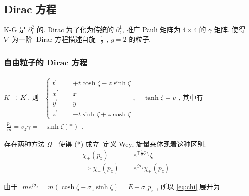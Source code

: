 \documentclass[../../main.tex]{subfiles}
\begin{document}
\subsection{Dirac 方程}
K-G 是 $\partial_{t}^{2}$ 的, Dirac 为了化为传统的 $\partial_{t}^{1}$, 推广 Pauli 矩阵为 $4\times 4$ 的 $\gamma$ 矩阵, 使得$\nabla$ 为一阶. Dirac 方程描述自旋 $\begin{aligned}
    \frac{1}{2}
\end{aligned}$, $g=2$ 的粒子.
\subsubsection{自由粒子的 Dirac 方程}

$K\rightarrow K^{\prime}$, 则 $\begin{aligned}\left\{\begin{aligned}
    t^{\prime} &= +t\cosh{\zeta} - z\sinh{\zeta}\\
    x^{\prime} &= x\\
    y^{\prime} &= y\\
    z^{\prime} &= -t\sinh{\zeta} + z\cosh{\zeta}
\end{aligned}\right.,\quad \tanh{\zeta}=v
\end{aligned}$, 其中有 $\begin{aligned}
    \frac{p_{z}}{m} = v_{z}\gamma = -\sinh{\zeta}(*)
\end{aligned}$. 

存在两种方法 $\Omega_{\pm}$ 使得 (*) 成立, 定义 Weyl 旋量来体现着这种区别:
\begin{align*}
    \chi_{\pm}(p_{z}) &= e^{\mp\frac{1}{2}\zeta\sigma_{z}}\xi\\
    \Rightarrow \chi_{-}(p_{z}) &= e^{\zeta\sigma_{z}}\chi_{+}(p_{z})\tag{**}\label{eq:chi}
\end{align*}

由于 $\begin{aligned}
    me^{\zeta\sigma_{z}} = m(\cosh{\zeta} + \sigma_{z}\sinh{\zeta}) = E - \sigma_{z}p_{z}
\end{aligned}$, 所以 \ref{eq:chi} 展开为
\end{document}
